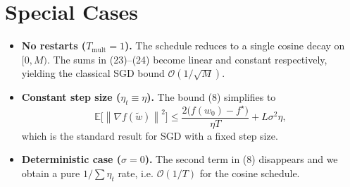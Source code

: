 \documentclass{article}
\newcommand{\E}{\mathbb{E}}
\newcommand{\norm}[1]{\left\lVert#1\right\rVert}
\begin{document}
\section*{Special Cases}
\begin{itemize}
\item \textbf{No restarts ($T_{\text{mult}}=1$).}  
      The schedule reduces to a single cosine decay on $[0,M)$.  
      The sums in (23)–(24) become linear and constant respectively,
      yielding the classical SGD bound $\mathcal{O}(1/\sqrt{M})$.
\item \textbf{Constant step size ($\eta_{t}\equiv\eta$).}  
      The bound (8) simplifies to
      \[
      \E\!\bigl[\norm{\nabla f(\tilde w)}^{2}\bigr]
      \le \frac{2\bigl(f(w_{0})-f^{\star}\bigr)}{\eta T}
          +L\sigma^{2}\eta,
      \]
      which is the standard result for SGD with a fixed step size.
\item \textbf{Deterministic case ($\sigma=0$).}  
      The second term in (8) disappears and we obtain a pure
      $1/\sum\eta_{t}$ rate, i.e. $\mathcal{O}(1/T)$ for the cosine schedule.
\end{itemize}
\end{document}
